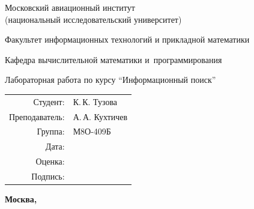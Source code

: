 \begin{titlepage}
\begin{center}
\bfseries

{\Large Московский авиационный институт\\ (национальный исследовательский университет)

}

\vspace{48pt}

{\large Факультет информационных технологий и прикладной математики
}

\vspace{36pt}

{\large Кафедра вычислительной математики и~программирования

}


\vspace{48pt}

Лабораторная работа  по курсу \enquote{Информационный поиск}

\end{center}

\vspace{72pt}

\begin{flushright}
\begin{tabular}{rl}
Студент: & К.\,К. Тузова \\
Преподаватель: & А.\,А. Кухтичев \\
Группа: & М8О-409Б \\
Дата: & \\
Оценка: & \\
Подпись: & \\
\end{tabular}
\end{flushright}

\vfill

\begin{center}
\bfseries
Москва, \the\year
\end{center}
\end{titlepage}

\pagebreak
